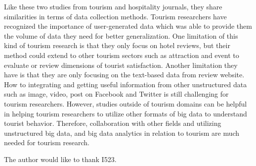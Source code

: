 \documentclass[sigconf]{acmart}
\begin{document}
Like these two studies from tourism and hospitality journals, they share similarities
in terms of data collection methods. Tourism researchers have recognized the
importance of user-generated data which was able to provide them the volume of data
they need for better generalization. One limitation of this kind of tourism research
is that they only focus on hotel reviews, but their method could extend to other
tourism sectors such as attraction and event to evaluate or review dimensions of
tourist satisfaction. Another limitation they have is that they are only focusing on
the text-based data from review website. How to integrating and getting useful
information from other unstructured data such as image, video, post on Facebook and
Twitter is still challenging for tourism researchers. However, studies outside of
tourism domains can be helpful in helping tourism researchers to utilize other formats
of big data to understand tourist behavior. Therefore, collaboration with other fields
and utilizing unstructured big data, and big data analytics in relation to tourism are
much needed for tourism research. 


\begin{acks}

  The author would like to thank I523.

\end{acks}


 
\end{document}
